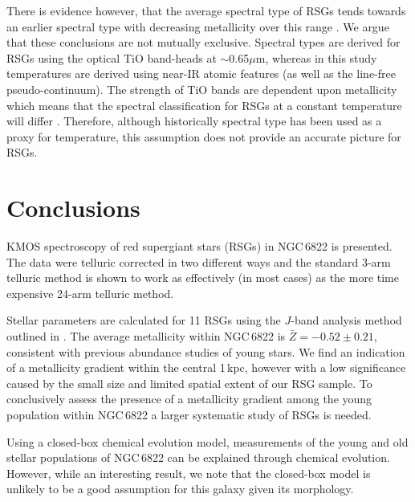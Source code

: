\documentclass[iop]{emulateapj}
\begin{document}
There is evidence however,
that the average spectral type of RSGs tends towards an earlier spectral type with decreasing metallicity over this range
\citep{1979ApJ...231..384H,2012AJ....144....2L}.
We argue that these conclusions are not mutually exclusive.
Spectral types are derived for RSGs using the optical TiO band-heads at
$\sim$0.65$\mu$m,
whereas in this study temperatures are derived using near-IR atomic features
(as well as the line-free pseudo-continuum).
The strength of TiO bands are dependent upon metallicity which means that 
the spectral classification for RSGs at a constant temperature will differ
\citep{2013ApJ...767....3D}. 
Therefore, although historically spectral type has been used as a proxy for temperature, this assumption does not provide an accurate picture for RSGs.




\section{Conclusions} %
\label{sec:conclusions}

KMOS spectroscopy of red supergiant stars (RSGs) in NGC\,6822 is presented.
The data were telluric corrected in two different ways and the standard 3-arm telluric method is shown to work as effectively (in most cases) as the more time expensive 24-arm telluric method.

Stellar parameters are calculated for 11 RSGs using the $J$-band analysis method outlined in
\cite{2010MNRAS.407.1203D}.
The average metallicity within NGC\,6822 is
$\bar{Z} = -0.52\pm 0.21$,
consistent with previous abundance studies of young stars.
We find an indication of a metallicity gradient within the central 1\,kpc,
however with a low significance caused by the small size and limited spatial extent of our RSG sample.
To conclusively assess the presence of a metallicity gradient among the young population within NGC\,6822 a larger systematic study of RSGs is needed.

Using a closed-box chemical evolution model,
measurements of the young and old stellar populations of NGC\,6822 can be explained through chemical evolution. 
However, while an interesting result, we note that the closed-box model is unlikely to be a good assumption for this galaxy given its morphology.
\end{document}
